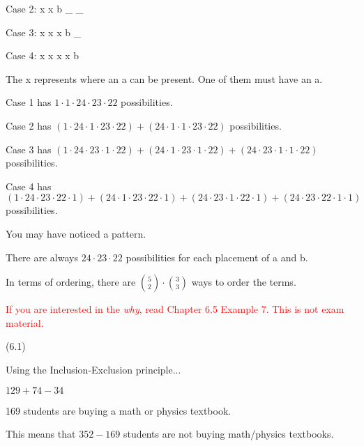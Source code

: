 \documentclass{exam}
\begin{document}
\begin{questions}
\begin{center}
Case 2: x x b \_ \_

Case 3: x x x b \_

Case 4: x x x x b

The x represents where an a can be present. One of them must have an a.

Case 1 has \(1 \cdot 1 \cdot 24 \cdot 23 \cdot 22\) possibilities.

Case 2 has \((1 \cdot 24 \cdot 1 \cdot 23 \cdot 22) + (24 \cdot 1 \cdot 1 \cdot 23 \cdot 22)\) possibilities.

Case 3 has \((1 \cdot 24 \cdot 23 \cdot 1 \cdot 22) + (24 \cdot 1 \cdot 23 \cdot 1 \cdot 22) + (24 \cdot 23 \cdot 1 \cdot 1 \cdot 22)\) possibilities. 

Case 4 has \((1 \cdot 24 \cdot 23 \cdot 22 \cdot 1) + (24 \cdot 1 \cdot 23 \cdot 22 \cdot 1) + (24 \cdot 23 \cdot 1 \cdot 22 \cdot 1) + (24 \cdot 23 \cdot 22 \cdot 1 \cdot 1)\) possibilities. 

You may have noticed a pattern.

There are always \(24 \cdot 23 \cdot 22\) possibilities for each placement of a and b.

In terms of ordering, there are \({5 \choose 2} \cdot {3 \choose 3}\) ways to order the terms.

\textcolor{red}{If you are interested in the \textit{why}, read Chapter 6.5 Example 7. This is not exam material.}

\end{center}

 (6.1)

\begin{center}

Using the Inclusion-Exclusion principle...

\(129 + 74 - 34\)

169 students are buying a math or physics textbook.

This means that \(352 - 169\) students are not buying math/physics textbooks.

\end{center}


\begin{center}


\end{center}
\end{questions}
\end{document}
